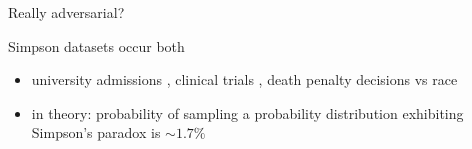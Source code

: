 



\begin{frame}{Really adversarial?}

Simpson datasets occur both
\begin{itemize}
  \item university admissions \cite{Bickel398}, clinical trials \cite{ABRAMSON19921480}, death penalty decisions vs race \cite{radelet1981racial}
  \item in theory: probability of sampling a probability distribution exhibiting Simpson's paradox is $\sim 1.7\%$ \cite{hadjicostas1998asymptotic}
\end{itemize}


\end{frame}


